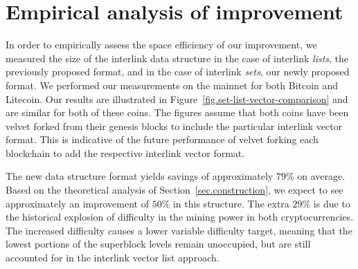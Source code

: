 \section{Empirical analysis of improvement}

In order to empirically assess the space efficiency of our improvement, we
measured the size of the interlink data structure in the case of interlink
\emph{lists}, the previously proposed format, and in the case of interlink
\emph{sets}, our newly proposed format. We performed our measurements on the
mainnet for both Bitcoin and Litecoin. Our results are illustrated in
Figure~\ref{fig.set-list-vector-comparison} and are similar for both of these
coins. The figures assume that both coins have been velvet forked from their
genesis blocks to include the particular interlink vector format. This is
indicative of the future performance of velvet forking each blockchain to add
the respective interlink vector format.

The new data structure format yields savings of approximately $79\%$ on average.
Based on the theoretical analysis of Section~\ref{sec.construction}, we expect
to see approximately an improvement of $50\%$ in this structure. The extra
$29\%$ is due to the historical explosion of difficulty in the mining power in
both cryptocurrencies. The increased difficulty causes a lower variable
difficulty target, meaning that the lowest portions of the superblock levels
remain unoccupied, but are still accounted for in the interlink vector list
approach.

